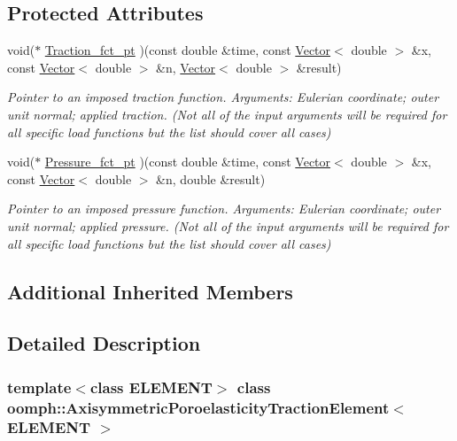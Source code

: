 \subsection*{Protected Attributes}
\begin{DoxyCompactItemize}
\item 
void($\ast$ \hyperlink{classoomph_1_1AxisymmetricPoroelasticityTractionElement_a60243c82b6016fdeaa118c348b007c13}{Traction\+\_\+fct\+\_\+pt} )(const double \&time, const \hyperlink{classoomph_1_1Vector}{Vector}$<$ double $>$ \&x, const \hyperlink{classoomph_1_1Vector}{Vector}$<$ double $>$ \&n, \hyperlink{classoomph_1_1Vector}{Vector}$<$ double $>$ \&result)
\begin{DoxyCompactList}\small\item\em Pointer to an imposed traction function. Arguments\+: Eulerian coordinate; outer unit normal; applied traction. (Not all of the input arguments will be required for all specific load functions but the list should cover all cases) \end{DoxyCompactList}\item 
void($\ast$ \hyperlink{classoomph_1_1AxisymmetricPoroelasticityTractionElement_a914e7f426769fe5e58d71fb2588449b8}{Pressure\+\_\+fct\+\_\+pt} )(const double \&time, const \hyperlink{classoomph_1_1Vector}{Vector}$<$ double $>$ \&x, const \hyperlink{classoomph_1_1Vector}{Vector}$<$ double $>$ \&n, double \&result)
\begin{DoxyCompactList}\small\item\em Pointer to an imposed pressure function. Arguments\+: Eulerian coordinate; outer unit normal; applied pressure. (Not all of the input arguments will be required for all specific load functions but the list should cover all cases) \end{DoxyCompactList}\end{DoxyCompactItemize}
\subsection*{Additional Inherited Members}


\subsection{Detailed Description}
\subsubsection*{template$<$class E\+L\+E\+M\+E\+NT$>$\newline
class oomph\+::\+Axisymmetric\+Poroelasticity\+Traction\+Element$<$ E\+L\+E\+M\+E\+N\+T $>$}

